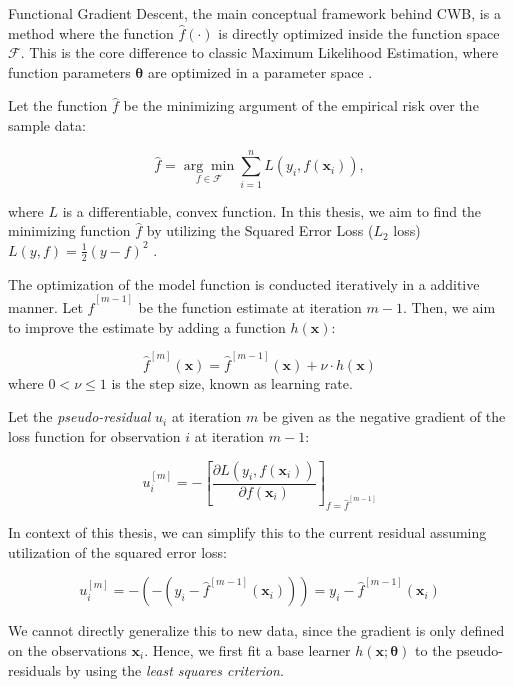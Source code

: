 \documentclass[fontsize=12 pt]{scrartcl}
\begin{document}
Functional Gradient Descent, the main conceptual framework behind CWB, is a method where the function $\hat{f}(\cdot)$ is directly optimized inside the function space $\mathcal{F}$. This is the core difference to classic Maximum Likelihood Estimation, where function parameters $\boldsymbol{\theta}$ are optimized in a parameter space \citep{mason1999boosting}.

Let the function $\hat{f}$ be the minimizing argument of the empirical risk over the sample data: 

\begin{equation}
    \hat{f} = \underset{f \in \mathcal{F}}{\arg \min} \sum_{i=1}^n L(y_i, f(\mathbf{x}_i)),
\end{equation}

where $L$ is a differentiable, convex function. In this thesis, we aim to find the minimizing function $\hat{f}$ by utilizing the Squared Error Loss ($L_2$ loss) $L(y, f) = \frac{1}{2}(y-f)^2$ \citep{vapnik1995nature}.

The optimization of the model function is conducted iteratively in a additive manner. Let $\hat{f}^{[m-1]}$ be the function estimate at iteration $m-1$. Then, we aim to improve the estimate by adding a function $h(\mathbf{x})$:

\begin{equation}
    \hat{f}^{[m]}(\mathbf{x}) = \hat{f}^{[m-1]}(\mathbf{x}) + \nu \cdot h(\mathbf{x})
\end{equation}
where $0 < \nu \leq 1$ is the step size, known as learning rate. 

Let the \textit{pseudo-residual} $u_i$ at iteration $m$ be given as the negative gradient of the loss function for observation $i$ at iteration $m-1$:

\begin{equation}
    u_i^{[m]} = - \left[ \frac{\partial L(y_i, f(\mathbf{x}_i))}{\partial f(\mathbf{x}_i)} \right]_{f = \hat{f}^{[m-1]}}
\end{equation}

In context of this thesis, we can simplify this to the current residual assuming utilization of the squared error loss:

\begin{equation}
    u_i^{[m]} = - \left( -(y_i - \hat{f}^{[m-1]}(\mathbf{x}_i)) \right) = y_i - \hat{f}^{[m-1]}(\mathbf{x}_i)
\end{equation}

We cannot directly generalize this to new data, since the gradient is only defined on the observations $\mathbf{x}_i$. Hence, we first fit a base learner $h(\mathbf{x}; \boldsymbol{\theta})$ to the pseudo-residuals by using the \textit{least squares criterion}. 
\end{document}
